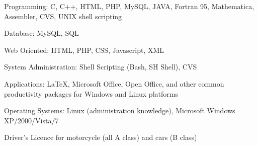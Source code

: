 \documentclass[10pt]{article}
\newcommand{\blankline}{\quad\pagebreak[2]}
\begin{document}
\blankline

Programming: C, C++, HTML, PHP, MySQL, JAVA, Fortran 95, Mathematica, Assembler, CVS, UNIX shell scripting

Database: MySQL, SQL

Web Oriented: HTML, PHP, CSS, Javascript, XML

System Administration: Shell Scripting (Bash, SH Shell), CVS

\blankline

Applications: \LaTeX{}, Microsoft Office, Open Office,
        and other common productivity packages for Windows and
        Linux platforms

\blankline

Operating Systems: Linux (administration knowledge), Microsoft Windows XP/2000/Vista/7

\blankline

Driver's Licence for motorcycle (all A class) and cars (B class)
\end{document}
